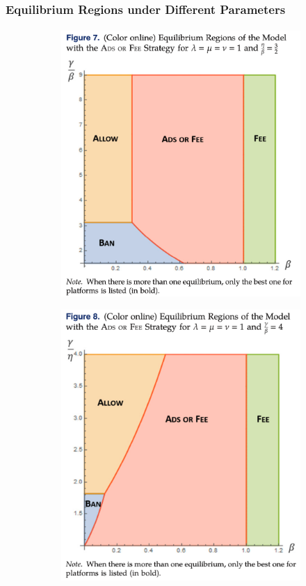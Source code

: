 \documentclass{beamer}
\begin{document}
\begin{frame}%
    \frametitle{Equilibrium Regions under Different Parameters}
    \framesubtitle{}
    \begin{figure}
        \centering
        \begin{subfigure}[b]{0.3\textwidth}
            \centering
            \includegraphics[width=\textwidth]{f7}
        \end{subfigure}
        \hfill
        \begin{subfigure}[b]{0.3\textwidth}
            \centering
            \includegraphics[width=\textwidth]{f8}

\end{subfigure}
\end{figure}
\end{frame}
\end{document}
